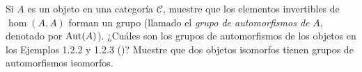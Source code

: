 \setcounter{neje}{1}
\begin{nejer}
Si $A$ es un objeto en una categoría $\mathscr{C}$, muestre que los elementos invertibles de $\hom(A,A)$ forman un grupo (llamado el \emph{grupo de automorfismos de} $A$, denotado por $\operatorname{Aut}(A)$). ¿Cuáles son los grupos de automorfismos de los objetos en los Ejemplos 1.2.2 y 1.2.3 (\cite{vakil2017})? Muestre que dos objetos isomorfos tienen grupos de automorfismos isomorfos. 
\end{nejer}
